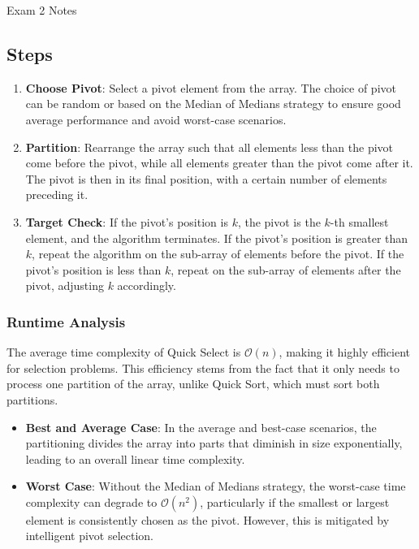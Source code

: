 \begin{examnotes}{Exam 2 Notes}
    \subsection*{Steps}
    
    \begin{enumerate}
        \item \textbf{Choose Pivot}: Select a pivot element from the array. The choice of pivot can be random or based on the Median of Medians strategy to ensure good average performance and avoid 
        worst-case scenarios.
        \item \textbf{Partition}: Rearrange the array such that all elements less than the pivot come before the pivot, while all elements greater than the pivot come after it. The pivot is then in 
        its final position, with a certain number of elements preceding it.
        \item \textbf{Target Check}: If the pivot's position is $k$, the pivot is the $k$-th smallest element, and the algorithm terminates. If the pivot's position is greater than $k$, repeat the 
        algorithm on the sub-array of elements before the pivot. If the pivot's position is less than $k$, repeat on the sub-array of elements after the pivot, adjusting $k$ accordingly.
    \end{enumerate}
    
    \subsubsection*{Runtime Analysis}
    
    The average time complexity of Quick Select is $\mathcal{O}(n)$, making it highly efficient for selection problems. This efficiency stems from the fact that it only needs to process one partition 
    of the array, unlike Quick Sort, which must sort both partitions.
    
    \begin{itemize}
        \item \textbf{Best and Average Case}: In the average and best-case scenarios, the partitioning divides the array into parts that diminish in size exponentially, leading to an overall linear 
        time complexity.
        \item \textbf{Worst Case}: Without the Median of Medians strategy, the worst-case time complexity can degrade to $\mathcal{O}(n^2)$, particularly if the smallest or largest element is consistently 
        chosen as the pivot. However, this is mitigated by intelligent pivot selection.
    \end{itemize}


\end{examnotes}
